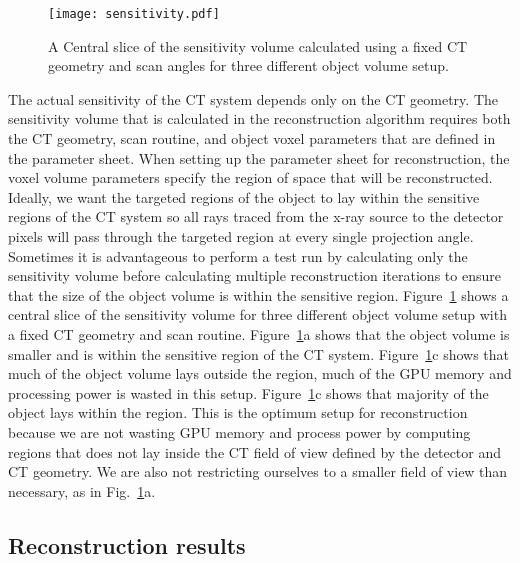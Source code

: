 \begin{figure}
\centering
\texttt{[image: sensitivity.pdf]}
\caption{A Central slice of the sensitivity volume calculated using a fixed CT geometry and scan angles for three different object volume setup.}
\label{fig:sensitivityslices}
\end{figure}

The actual sensitivity of the CT system depends only on the CT geometry.  The sensitivity volume that is calculated in the reconstruction algorithm requires both the CT geometry, scan routine, and object voxel parameters that are defined in the parameter sheet.  When setting up the parameter sheet for reconstruction, the voxel volume parameters specify the region of space that will be reconstructed.  Ideally, we want the targeted regions of the object to lay within the sensitive regions of the CT system so all rays traced from the x-ray source to the detector pixels will pass through the targeted region at every single projection angle.  Sometimes it is advantageous to perform a test run by calculating only the sensitivity volume before calculating multiple reconstruction iterations to ensure that the size of the object volume is within the sensitive region.  Figure~\ref{fig:sensitivityslices} shows a central slice of the sensitivity volume for three different object volume setup with a fixed CT geometry and scan routine.  Figure~\ref{fig:sensitivityslices}a shows that the object volume is smaller and is within the sensitive region of the CT system.  Figure~\ref{fig:sensitivityslices}c shows that much of the object volume lays outside the region, much of the GPU memory and processing power is wasted in this setup. Figure~\ref{fig:sensitivityslices}c shows that majority of the object lays within the region.  This is the optimum setup for reconstruction because we are not wasting GPU memory and process power by computing regions that does not lay inside the CT field of view defined by the detector and CT geometry.  We are also not restricting ourselves to a smaller field of view than necessary, as in Fig.~\ref{fig:sensitivityslices}a.

\subsection{Reconstruction results}

